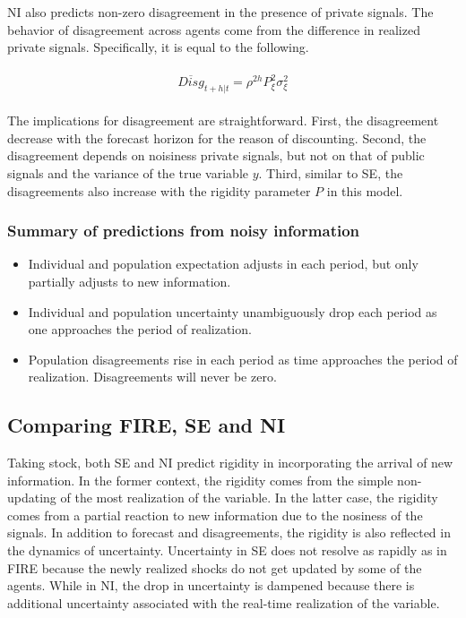\documentclass[]{article}
\begin{document}
	NI also predicts non-zero disagreement in the presence of private signals. The behavior of disagreement across agents come from the difference in realized private signals. Specifically, it is equal to the following. 
	
	\begin{eqnarray}
		\begin{aligned}
			\overline {Disg}_{t+h|t} = \rho^{2h} P^2_\xi \sigma^2_\xi  
		\end{aligned}
	\end{eqnarray}
	
	The implications for disagreement are straightforward. First, the disagreement decrease with the forecast horizon for the reason of discounting. Second, the disagreement depends on noisiness private signals, but not on that of public signals and the variance of the true variable $y$. Third, similar to SE, the disagreements also increase with the rigidity parameter $P$ in this model.
	
	\subsubsection{Summary of predictions from noisy information}
	
	\begin{itemize}
		\item Individual and population expectation adjusts in each period, but only partially adjusts to new information. 
		\item  Individual and population uncertainty unambiguously drop each period as one approaches the period of realization.  
		\item  Population disagreements rise in each period as time approaches the period of realization. Disagreements will never be zero. 
	\end{itemize}
	
	
	\subsection{Comparing FIRE, SE and NI}
	
	Taking stock, both SE and NI predict rigidity in incorporating the arrival of new information. In the former context, the rigidity comes from the simple non-updating of the most realization of the variable. In the latter case, the rigidity comes from a partial reaction to new information due to the nosiness of the signals.  In addition to forecast and disagreements, the rigidity is also reflected in the dynamics of uncertainty.  Uncertainty in SE does not resolve as rapidly as in FIRE because the newly realized shocks do not get updated by some of the agents. While in NI, the drop in uncertainty is dampened because there is additional uncertainty associated with the real-time realization of the variable.  
	
\end{document}
